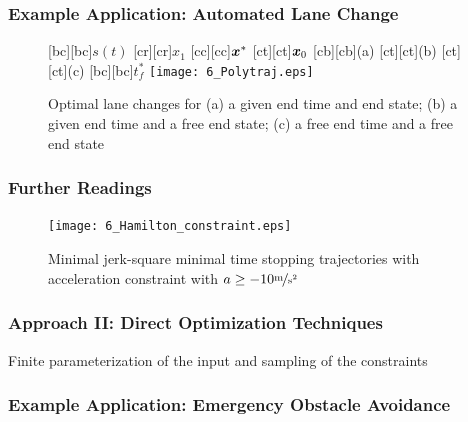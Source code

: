 \subsubsection{Example Application: Automated Lane Change}\label{sec:example_application_ALC}

\begin{figure}[h]
\centering
	[bc][bc]{$s(t)$}
	[cr][cr]{$x_1$}
	[cc][cc]{$\boldsymbol{x}^\ast$}
	[ct][ct]{$\boldsymbol{x}_0$}
	[cb][cb]{\scriptsize (a)}
	[ct][ct]{\scriptsize (b)}
	[ct][ct]{\scriptsize (c)}
	[bc][bc]{$t_f^\ast$}
	\centering
  	\texttt{[image: 6\_Polytraj.eps]}
  \caption{Optimal lane changes for (a) a given end time and end state; (b) a given end time and a free end state; (c) a free end time and a free end state}
    \label{fig:polytraj}
\end{figure}

\subsubsection{Further Readings}


\begin{figure}[ht]
\centering

\renewcommand{\matlabtextA}{\normalsize }
	\def\ylabelV{$x_2$ in $\unitfrac{m}{s}$}
	\def\ylabelA{$x_3$ in $\unitfrac{m}{s^2}$}
	\def\xlabelT{$t$ in $\unit{s}$}
	\def\xlabelX{$x_1$ in $\unit{m}$}
	\centering
  	\texttt{[image: 6\_Hamilton\_constraint.eps]}
  \caption{Minimal jerk-square minimal time stopping trajectories with acceleration constraint with $a\geq -10 \unitfrac{m}{s^2}$}
    \label{fig:poly_mit_unb}
\end{figure}



\subsubsection{Approach II: Direct Optimization Techniques}


Finite parameterization of the input and sampling of the constraints

\subsubsection{Example Application: Emergency Obstacle Avoidance}


